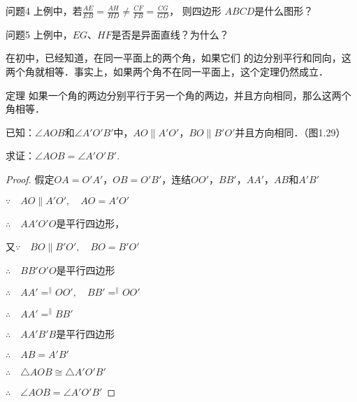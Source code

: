 \begin{blk}{问题4}
  上例中，若$\frac{AE}{EB}=\frac{AH}{HD}\ne \frac{CF}{FB}=\frac{CG}{GD}$，
则四边形
$ABCD$是什么图形？
\end{blk}

\begin{blk}{问题5}
  上例中，$EG$、$HF$是否是异面直线？为什么？
\end{blk}


在初中，已经知道，在同一平面上的两个角，如果它们
的边分别平行和同向，这两个角就相等．事实上，如果两个角不在同一平面上，这个定理仍然成立．

\begin{blk}
  {定理} 如果一个角的两边分别平行于另一个角的两边，并且方向相同，那么这两个角相等．
\end{blk}

已知：$\angle AOB$和$\angle A'O'B'$中，$AO\parallel A'O'$，$BO\parallel B'O'$并且方向相同．（图1.29）

求证：$\angle AOB=\angle A'O'B'$.

\begin{figure}[htp]
  \centering
{}
  \caption{}
\end{figure}

\begin{proof}
  假定$OA=O'A'$，$OB=O'B'$，连结$OO'$，$BB'$，$AA'$，$AB$和$A'B'$

$\because \quad AO\parallel A'O',\quad AO=A'O'$

$\therefore\quad AA'O'O$是平行四边形，

又$\because\quad BO\parallel B'O',\quad BO=B'O'$

$\therefore\quad BB'O'O$是平行四边形

$\therefore\quad AA'\displaystyle\mathop{=}^{\parallel} OO',\quad BB'\displaystyle\mathop{=}^{\parallel}OO'$

$\therefore\quad AA'\displaystyle\mathop{=}^{\parallel}BB'$

$\therefore\quad AA'B'B$是平行四边形

$\therefore\quad AB=A'B'$

$\therefore\quad \triangle AOB\cong\triangle A'O'B'$

$\therefore\quad \angle AOB=\angle A'O'B'$
\end{proof}

